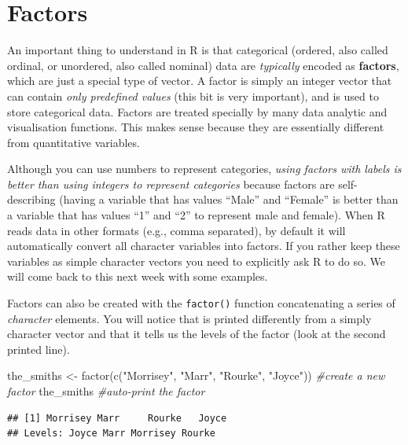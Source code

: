\documentclass[
]{book}
\newenvironment{Shaded}{\begin{snugshade}}{\end{snugshade}}
\newcommand{\CommentTok}[1]{\textcolor[rgb]{0.56,0.35,0.01}{\textit{#1}}}
\newcommand{\FunctionTok}[1]{\textcolor[rgb]{0.00,0.00,0.00}{#1}}
\newcommand{\NormalTok}[1]{#1}
\newcommand{\OtherTok}[1]{\textcolor[rgb]{0.56,0.35,0.01}{#1}}
\newcommand{\StringTok}[1]{\textcolor[rgb]{0.31,0.60,0.02}{#1}}
\begin{document}
\hypertarget{factors}{%
\section{Factors}\label{factors}}

An important thing to understand in R is that categorical (ordered, also called ordinal, or unordered, also called nominal) data are \emph{typically} encoded as \textbf{factors}, which are just a special type of vector. A factor is simply an integer vector that can contain \emph{only predefined values} (this bit is very important), and is used to store categorical data. Factors are treated specially by many data analytic and visualisation functions. This makes sense because they are essentially different from quantitative variables.

Although you can use numbers to represent categories, \emph{using factors with labels is better than using integers to represent categories} because factors are self-describing (having a variable that has values ``Male'' and ``Female'' is better than a variable that has values ``1'' and ``2'' to represent male and female). When R reads data in other formats (e.g., comma separated), by default it will automatically convert all character variables into factors. If you rather keep these variables as simple character vectors you need to explicitly ask R to do so. We will come back to this next week with some examples.

Factors can also be created with the \texttt{factor()} function concatenating a series of \emph{character} elements. You will notice that is printed differently from a simply character vector and that it tells us the levels of the factor (look at the second printed line).

\begin{Shaded}
\begin{Highlighting}[]
\NormalTok{the\_smiths }\OtherTok{\textless{}{-}} \FunctionTok{factor}\NormalTok{(}\FunctionTok{c}\NormalTok{(}\StringTok{"Morrisey"}\NormalTok{, }\StringTok{"Marr"}\NormalTok{, }\StringTok{"Rourke"}\NormalTok{, }\StringTok{"Joyce"}\NormalTok{)) }\CommentTok{\#create a new factor}
\NormalTok{the\_smiths }\CommentTok{\#auto{-}print the factor}
\end{Highlighting}
\end{Shaded}

\begin{verbatim}
## [1] Morrisey Marr     Rourke   Joyce   
## Levels: Joyce Marr Morrisey Rourke
\end{verbatim}
\end{document}
